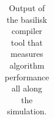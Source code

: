 \begin{table}
\begin{tabular}{c|c|c|c|l}
\end{tabular}
\caption{Output of the basilisk compiler tool that measures algorithm performance all along the simulation.}
\end{table}




